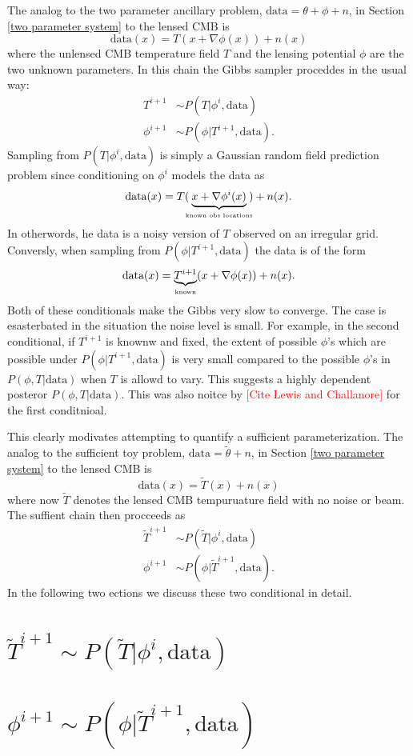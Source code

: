 \documentclass[11pt]{article}
\begin{document}
The analog to the two parameter ancillary problem, $\text{data} = \theta +\phi +n$,  in Section \ref{two parameter system} to the lensed CMB is 
\[\text{data}(x) = T(x+\nabla \phi(x)) + n(x)\]
where the unlensed  CMB temperature field $T$ and the lensing potential $\phi$ are the two unknown parameters. In this chain the Gibbs sampler proceddes in the usual way:
\begin{align}
T^{i+1}&\sim P(T |  \phi^{i},\text{data})\\
\phi^{i+1}&\sim P(\phi | T^{i+1},  \text{data}).
\end{align}
Sampling from $P(T |  \phi^{i},\text{data})$ is simply a Gaussian random field prediction problem since conditioning on $\phi^i$ models the data as
\[ \text{data}(x) = T(\!\!\underbrace{x+\nabla\phi^i(x)}_\text{\tiny known obs locations}\!\!) + n(x).\]
In otherwords, he data is a noisy version of  $T$ observed on an irregular grid. 
Conversly, when sampling from $P(\phi |  T^{i+1},\text{data})$ the data is of the form
\[ \text{data}(x) = \underbrace{T^{i+1}}_{\text{\tiny known}}(x+\nabla\phi(x)) + n(x). \]
Both of these conditionals make the Gibbs very slow to converge. The case is esasterbated in the situation the noise level is small. For example, in the second conditional, if $T^{i+1}$ is knownw and fixed, the extent of possible  $\phi$'s which are possible under $P(\phi|T^{i+1},\text{data})$  is very small compared to the possible $\phi$'s  in $P(\phi, T| \text{data})$ when $T$ is allowd to vary. 
This suggests a highly dependent posteror $P(\phi, T| \text{data})$. 
This was also noitce by \textcolor{red}{[Cite Lewis and Challanore]} for the first conditnioal.

This clearly modivates attempting to quantify a  sufficient parameterization. The analog to the sufficient toy problem, $\text{data} = \widetilde\theta + n$,  in Section \ref{two parameter system} to the lensed CMB is 
\[\text{data}(x) = \widetilde T(x) + n(x)\]
where now $\widetilde T$ denotes the lensed CMB tempuruature field with no noise or beam.
The suffient chain then procceeds as
\begin{align}
\widetilde T^{i+1}&\sim P(\widetilde T |  \phi^{i},\text{data})\\
\phi^{i+1}&\sim P(\phi | \widetilde T^{i+1},  \text{data}).
\end{align}
In the following two ections we discuss these two conditional in detail.


\section{$\widetilde T^{i+1}\sim P(\widetilde T |  \phi^{i},\text{data})$}


\section{$\phi^{i+1}\sim P(\phi | \widetilde T^{i+1},  \text{data})$}
\end{document}
